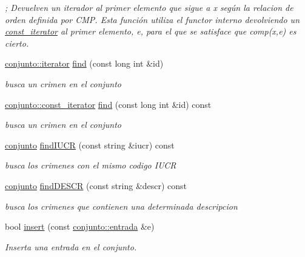 \begin{DoxyCompactItemize}
\begin{DoxyCompactList}\small\item\em ; Devuelven un iterador al primer elemento que sigue a x según la relacion de orden definida por C\+M\+P. Esta función utiliza el functor interno devolviendo un \hyperlink{classconjunto_1_1const__iterator}{const\+\_\+iterator} al primer elemento, e, para el que se satisface que comp(x,e) es cierto. \end{DoxyCompactList}\item 
\hyperlink{classconjunto_1_1iterator}{conjunto\+::iterator} \hyperlink{classconjunto_a01ef97588beb5b28f18d2d8c02881f4c}{find} (const long int \&id)
\begin{DoxyCompactList}\small\item\em busca un crimen en el conjunto \end{DoxyCompactList}\item 
\hyperlink{classconjunto_1_1const__iterator}{conjunto\+::const\+\_\+iterator} \hyperlink{classconjunto_a725ddba7aa25ad0576f13000e035ee6f}{find} (const long int \&id) const 
\begin{DoxyCompactList}\small\item\em busca un crimen en el conjunto \end{DoxyCompactList}\item 
\hyperlink{classconjunto}{conjunto} \hyperlink{classconjunto_a076dc70516af91c07b570bca24c6d9f7}{find\+I\+U\+C\+R} (const string \&iucr) const 
\begin{DoxyCompactList}\small\item\em busca los crimenes con el mismo codigo I\+U\+C\+R \end{DoxyCompactList}\item 
\hyperlink{classconjunto}{conjunto} \hyperlink{classconjunto_ab4f2fdce330e5b53c3ac8f529ccd435d}{find\+D\+E\+S\+C\+R} (const string \&descr) const 
\begin{DoxyCompactList}\small\item\em busca los crimenes que contienen una determinada descripcion \end{DoxyCompactList}\item 
bool \hyperlink{classconjunto_adb7f70590741e9f7db3a28de60f4452a}{insert} (const \hyperlink{classconjunto_a7630ace7cb17bcec07daf5804f1a0780}{conjunto\+::entrada} \&e)
\begin{DoxyCompactList}\small\item\em Inserta una entrada en el conjunto. \end{DoxyCompactList}\item 

\end{DoxyCompactItemize}
